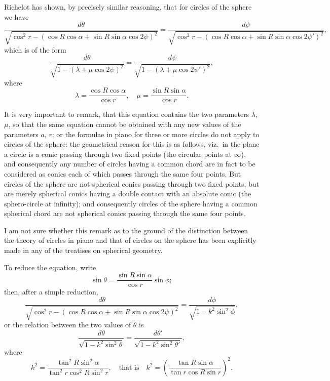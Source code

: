 \documentclass[11pt,a4paper]{book}
\begin{document}
Richelot has shown, by precisely similar reasoning, that for circles of the sphere we have
\[
\frac{d\theta}{\sqrt{\cos^2 r - (\cos R \cos\alpha + \sin R \sin\alpha \cos 2\psi)^2}} = \frac{d\psi}{\sqrt{\cos^2 r - (\cos R \cos\alpha + \sin R \sin\alpha \cos 2\psi')^2}},
\]
which is of the form
\[
\frac{d\theta}{\sqrt{1-(\lambda + \mu\cos 2\psi)^2}} = \frac{d\psi}{\sqrt{1-(\lambda + \mu\cos 2\psi')^2}},
\]
where
\[
\lambda = \frac{\cos R \cos\alpha}{\cos r}, \quad \mu = \frac{\sin R \sin\alpha}{\cos r}.
\]

It is very important to remark, that this equation contains the two parameters $\lambda$, $\mu$, so that the same equation cannot be obtained with any new values of the parameters $a$, $r$; or the formulae in piano for three or more circles do not apply to circles of the sphere: the geometrical reason for this is as follows, viz.\ in the plane a circle is a conic passing through two fixed points (the circular points at $\infty$), and consequently any number of circles having a common chord are in fact to be considered as conics each of which passes through the same four points. But circles of the sphere are not spherical conics passing through two fixed points, but are merely spherical conics having a double contact with an absolute conic (the sphero-circle at infinity); and consequently circles of the sphere having a common spherical chord are not spherical conics passing through the same four points.

I am not sure whether this remark as to the ground of the distinction between the theory of circles in piano and that of circles on the sphere has been explicitly made in any of the treatises on spherical geometry.

To reduce the equation, write
\[
\sin\theta = \frac{\sin R \sin\alpha}{\cos r} \sin\phi;
\]
then, after a simple reduction,
\[
\frac{d\theta}{\sqrt{\cos^2 r - (\cos R \cos\alpha + \sin R \sin\alpha \cos 2\psi)^2}} = \frac{d\phi}{\sqrt{1 - k^2\sin^2\phi}},
\]
or the relation between the two values of $\theta$ is
\[
\frac{d\theta}{\sqrt{1 - k^2\sin^2\theta}} = \frac{d\theta'}{\sqrt{1 - k^2\sin^2\theta'}},
\]
where
\[
k^2 = \frac{\tan^2 R \sin^2\alpha}{\tan^2 r \cos^2 R \sin^2 r}, \quad \text{that is} \quad k^2 = \left(\frac{\tan R \sin\alpha}{\tan r \cos R \sin r}\right)^2.
\]
\end{document}
